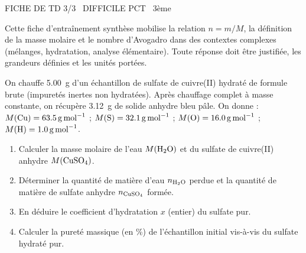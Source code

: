 \documentclass[11pt]{article}
\begin{document}
\pagestyle{empty}

\begin{tcolorbox}[enhanced,colback=popink,colframe=popink,arc=10pt,boxrule=0pt,left=12pt,right=12pt,top=9pt,bottom=9pt]
{\color{white}\popxbold\small FICHE DE TD 3/3 \textbullet\ DIFFICILE \hfill PCT \textbullet\ 3ème\par}
\end{tcolorbox}
\vspace{4pt}

Cette fiche d'entraînement synthèse mobilise la relation $n = m/M$, la définition de la masse molaire et le nombre d'Avogadro dans des contextes complexes (mélanges, hydratation, analyse élémentaire). Toute réponse doit être justifiée, les grandeurs définies et les unités portées.

\begin{exercice}
On chauffe \SI{5,00}{\gram} d'un échantillon de sulfate de cuivre(II) hydraté de formule brute  (impuretés inertes non hydratées). Après chauffage complet à masse constante, on récupère \SI{3,12}{\gram} de solide anhydre bleu pâle. On donne : $M(\ce{Cu}) = \SI{63,5}{\gram\per\mole}$ ; $M(\ce{S}) = \SI{32,1}{\gram\per\mole}$ ; $M(\ce{O}) = \SI{16,0}{\gram\per\mole}$ ; $M(\ce{H}) = \SI{1,0}{\gram\per\mole}$.
\begin{enumerate}
    \item Calculer la masse molaire de l'eau $M(\ce{H2O})$ et du sulfate de cuivre(II) anhydre $M(\ce{CuSO4})$.
    \item Déterminer la quantité de matière d'eau $n_{\ce{H2O}}$ perdue et la quantité de matière de sulfate anhydre $n_{\ce{CuSO4}}$ formée.
    \item En déduire le coefficient d'hydratation $x$ (entier) du sulfate pur.
    \item Calculer la pureté massique (en \%) de l'échantillon initial vis-à-vis du sulfate hydraté pur.
\end{enumerate}
\end{exercice}
\end{document}
